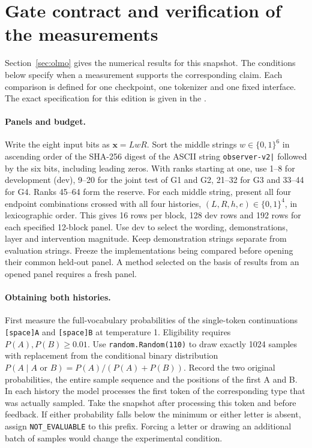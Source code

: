 \section{Gate contract and verification of the measurements}
\label{app:gates}

Section~\ref{sec:olmo} gives the numerical results for this snapshot. The conditions below specify when a measurement supports the corresponding claim. Each comparison is defined for one checkpoint, one tokenizer and one fixed interface. The exact specification for this edition is given in the .

\paragraph{Panels and budget.}
Write the eight input bits as $\mathbf{x}=LwR$. Sort the middle strings $w\in\{0,1\}^6$ in ascending order of the SHA-256 digest of the ASCII string \verb!observer-v2|! followed by the six bits, including leading zeros. With ranks starting at one, use 1--8 for development (dev), 9--20 for the joint test of G1 and G2, 21--32 for G3 and 33--44 for G4. Ranks 45--64 form the reserve. For each middle string, present all four endpoint combinations crossed with all four histories, $(L,R,h,e)\in\{0,1\}^4$, in lexicographic order. This gives 16 rows per block, 128 dev rows and 192 rows for each specified 12-block panel. Use dev to select the wording, demonstrations, layer and intervention magnitude. Keep demonstration strings separate from evaluation strings. Freeze the implementations being compared before opening their common held-out panel. A method selected on the basis of results from an opened panel requires a fresh panel.

\paragraph{Obtaining both histories.}
First measure the full-vocabulary probabilities of the single-token continuations \texttt{[space]A} and \texttt{[space]B} at temperature 1. Eligibility requires $P(A),P(B)\ge 0.01$. Use \texttt{random.Random(110)} to draw exactly 1024 samples with replacement from the conditional binary distribution $P(A\mid A\text{ or }B)=P(A)/(P(A)+P(B))$. Record the two original probabilities, the entire sample sequence and the positions of the first A and B. In each history the model processes the first token of the corresponding type that was actually sampled. Take the snapshot after processing this token and before feedback. If either probability falls below the minimum or either letter is absent, assign \texttt{NOT\_EVALUABLE} to this prefix. Forcing a letter or drawing an additional batch of samples would change the experimental condition.

